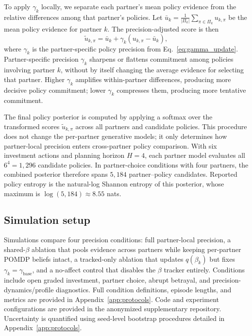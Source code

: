To apply \(\gamma_k\) locally, we separate each partner's mean policy evidence from the relative differences among that partner's policies. Let \(\bar{u}_k = \frac{1}{|\Pi_k|}\sum_{\pi\in\Pi_k} u_{k,\pi}\) be the mean policy evidence for partner $k$. The precision-adjusted score is then
\begin{equation}
\tilde{u}_{k,\pi} = \bar{u}_k + \gamma_k\left(u_{k,\pi} - \bar{u}_k\right),
\label{eq:centered_policy_scores}
\end{equation}
where $\gamma_k$ is the partner-specific policy precision from Eq.~\eqref{eq:gamma_update}. Partner-specific precision \(\gamma_k\) sharpens or flattens commitment among policies involving partner \(k\), without by itself changing the average evidence for selecting that partner. Higher \(\gamma_k\) amplifies within-partner differences, producing more decisive policy commitment; lower \(\gamma_k\) compresses them, producing more tentative commitment.

The final policy posterior is computed by applying a softmax over the transformed scores \(\tilde{u}_{k,\pi}\) across all partners and candidate policies. This procedure does not change the per-partner generative models; it only determines how partner-local precision enters cross-partner policy comparison. With six investment actions and planning horizon \(H=4\), each partner model evaluates all \(6^4=1{,}296\) candidate policies. In partner-choice conditions with four partners, the combined posterior therefore spans \(5{,}184\) partner--policy candidates. Reported policy entropy is the natural-log Shannon entropy of this posterior, whose maximum is \(\log(5{,}184)\approx8.55\) nats.

\subsection{Simulation setup}
\label{sec:simulation_setup}

Simulations compare four precision conditions: full partner-local precision, a shared-$\beta$ ablation that pools evidence across partners while keeping per-partner POMDP beliefs intact, a tracked-only ablation that updates $q(\beta_k)$ but fixes $\gamma_k = \gamma_{\text{base}}$, and a no-affect control that disables the $\beta$ tracker entirely. Conditions include open graded investment, partner choice, abrupt betrayal, and precision-dynamics/profile diagnostics. Full condition definitions, episode lengths, and metrics are provided in Appendix~\ref{app:protocols}. Code and experiment configurations are provided in the anonymized supplementary repository. Uncertainty is quantified using seed-level bootstrap procedures detailed in Appendix~\ref{app:protocols}.

